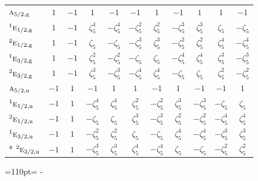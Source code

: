 \documentclass[10pt,a4paper]{article}
\makeatletter
\def\grouprule#1#2{\noalign{\marks\LTgroupmarks{\the\belowrulesep}\nobreak\vskip#1%
  \vskip\aboverulesep}\multispan\LT@cols\unskip{\leaders\hrule\@height#2\hfill\kern\z@}\cr
  \noalign{\penalty\LTrulebreak\vskip\belowrulesep\global\@lastruleclass\z@}}
\newcommand{\needspace}[1]{\par\penalty-100\begingroup\dimen0=#1\relax\dimen2=\pagegoal
  \advance\dimen2-\pagetotal\ifdim\dimen0>\dimen2\relax\ifdim\dimen2>0pt\vfil\break\fi\fi
  \endgroup}
\numberwithin{equation}{section}
\newcommand{\irr}[1]{\text{\normalfont\scshape #1}}
\newcommand{\conjpair}[1]{{}^{#1}}
\newcommand{\ptag}[1]{\mathrm{#1}}
\newcommand{\rootunity}[1]{\zeta_{#1}}
\makeatother
\begin{document}
{\begin{longtable}{@{}lcccccccccc@{}}
\grouprule{0pt}{\lightrulewidth}
$\irr{a}_{5/2,\ptag{g}}$ & $1$ & $-1$ & $1$ & $-1$ & $-1$ & $1$ & $-1$ & $1$ & $1$ & $-1$\\
$\conjpair{1}\irr{e}_{1/2,\ptag{g}}$ & $1$ & $-1$ & $\rootunity{5}^{4}$ & $-\rootunity{5}^{4}$ & $-\rootunity{5}^{2}$ & $\rootunity{5}^{2}$ & $-\rootunity{5}^{3}$ & $\rootunity{5}^{3}$ & $\rootunity{5}$ & $-\rootunity{5}$\\
$\conjpair{2}\irr{e}_{1/2,\ptag{g}}$ & $1$ & $-1$ & $\rootunity{5}$ & $-\rootunity{5}$ & $-\rootunity{5}^{3}$ & $\rootunity{5}^{3}$ & $-\rootunity{5}^{2}$ & $\rootunity{5}^{2}$ & $\rootunity{5}^{4}$ & $-\rootunity{5}^{4}$\\
$\conjpair{1}\irr{e}_{3/2,\ptag{g}}$ & $1$ & $-1$ & $\rootunity{5}^{2}$ & $-\rootunity{5}^{2}$ & $-\rootunity{5}$ & $\rootunity{5}$ & $-\rootunity{5}^{4}$ & $\rootunity{5}^{4}$ & $\rootunity{5}^{3}$ & $-\rootunity{5}^{3}$\\
$\conjpair{2}\irr{e}_{3/2,\ptag{g}}$ & $1$ & $-1$ & $\rootunity{5}^{3}$ & $-\rootunity{5}^{3}$ & $-\rootunity{5}^{4}$ & $\rootunity{5}^{4}$ & $-\rootunity{5}$ & $\rootunity{5}$ & $\rootunity{5}^{2}$ & $-\rootunity{5}^{2}$\\
$\irr{a}_{5/2,\ptag{u}}$ & $-1$ & $1$ & $-1$ & $1$ & $1$ & $-1$ & $1$ & $-1$ & $-1$ & $1$\\
$\conjpair{1}\irr{e}_{1/2,\ptag{u}}$ & $-1$ & $1$ & $-\rootunity{5}^{4}$ & $\rootunity{5}^{4}$ & $\rootunity{5}^{2}$ & $-\rootunity{5}^{2}$ & $\rootunity{5}^{3}$ & $-\rootunity{5}^{3}$ & $-\rootunity{5}$ & $\rootunity{5}$\\
$\conjpair{2}\irr{e}_{1/2,\ptag{u}}$ & $-1$ & $1$ & $-\rootunity{5}$ & $\rootunity{5}$ & $\rootunity{5}^{3}$ & $-\rootunity{5}^{3}$ & $\rootunity{5}^{2}$ & $-\rootunity{5}^{2}$ & $-\rootunity{5}^{4}$ & $\rootunity{5}^{4}$\\
$\conjpair{1}\irr{e}_{3/2,\ptag{u}}$ & $-1$ & $1$ & $-\rootunity{5}^{2}$ & $\rootunity{5}^{2}$ & $\rootunity{5}$ & $-\rootunity{5}$ & $\rootunity{5}^{4}$ & $-\rootunity{5}^{4}$ & $-\rootunity{5}^{3}$ & $\rootunity{5}^{3}$\\*
$\conjpair{2}\irr{e}_{3/2,\ptag{u}}$ & $-1$ & $1$ & $-\rootunity{5}^{3}$ & $\rootunity{5}^{3}$ & $\rootunity{5}^{4}$ & $-\rootunity{5}^{4}$ & $\rootunity{5}$ & $-\rootunity{5}$ & $-\rootunity{5}^{2}$ & $\rootunity{5}^{2}$\\
\bottomrule\end{longtable}}
\needspace{110pt}
\end{document}

